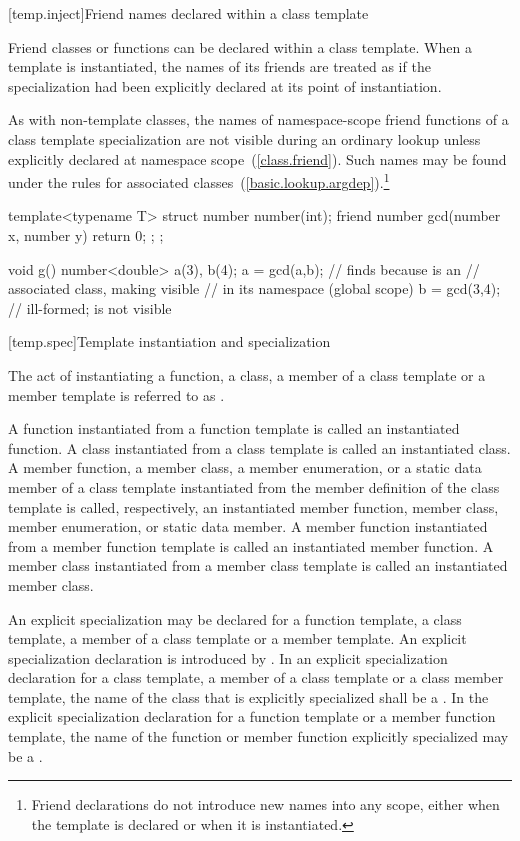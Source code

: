 [temp.inject]{Friend names declared within a class template}

\pnum
Friend classes or functions can be declared within a class template.
When a template is instantiated, the names of its friends are treated
as if the specialization had been explicitly declared at its point of
instantiation.

\pnum
As with non-template classes, the names of namespace-scope friend
functions of a class template specialization are not visible during
an ordinary lookup unless explicitly declared at namespace scope~(\ref{class.friend}).
Such names may be found under the rules for associated
classes~(\ref{basic.lookup.argdep}).\footnote{Friend declarations do not
introduce new names into any scope, either
when the template is declared or when it is instantiated.}
\enterexample
\begin{codeblock}
template<typename T> struct number {
  number(int);
  friend number gcd(number x, number y) { return 0; };
};

void g() {
  number<double> a(3), b(4);
  a = gcd(a,b);     // finds  because  is an
                    // associated class, making  visible
                    // in its namespace (global scope)
  b = gcd(3,4);     // ill-formed;  is not visible
}
\end{codeblock}
\exitexample

[temp.spec]{Template instantiation and specialization}

\pnum
{}%
The act of instantiating a function, a class, a member of a class template or
a member template is referred to as
.

\pnum
A function instantiated from a function template is called an instantiated
function.
A class instantiated from a class template is called an instantiated class.
A member function, a member class, a member enumeration, or a static data member of a class template
instantiated from the member definition of the class template is called,
respectively, an instantiated member function, member class, member enumeration, or static data
member.
A member function instantiated from a member function template is called an
instantiated member function.
A member class instantiated from a member class template is called an
instantiated member class.

\pnum
An explicit specialization may be declared for a function template,
a class template, a member of a class template or a member template.
An explicit specialization declaration is introduced by
.
In an explicit specialization declaration for a class template,
a member of a class template or a class member template,
the name of the class that is explicitly specialized shall be a
.
In the explicit specialization declaration for a function template or
a member function template,
the name of the function or member function explicitly specialized may be a
.
\enterexample

